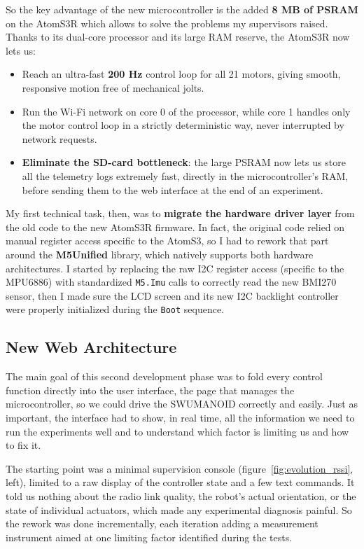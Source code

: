 \documentclass{tropLaClasse}
\begin{document}
So the key advantage of the new microcontroller is the added \textbf{8 MB of PSRAM} on the AtomS3R \cite{m5stack_atoms3r} which allows to solve the problems my supervisors raised. Thanks to its dual-core processor and its large RAM reserve, the AtomS3R now lets us:
\begin{itemize}
    \item Reach an ultra-fast \textbf{200 Hz} control loop for all 21 motors, giving smooth, responsive motion free of mechanical jolts.
    \item Run the Wi-Fi network on core 0 of the processor, while core 1 handles only the motor control loop in a strictly deterministic way, never interrupted by network requests.
    \item \textbf{Eliminate the SD-card bottleneck}: the large PSRAM now lets us store all the telemetry logs extremely fast, directly in the microcontroller's RAM, before sending them to the web interface at the end of an experiment.
\end{itemize}

My first technical task, then, was to \textbf{migrate the hardware driver layer} from the old code to the new AtomS3R firmware. In fact, the original code relied on manual register access specific to the AtomS3, so I had to rework that part around the \textbf{M5Unified} library, which natively supports both hardware architectures. I started by replacing the raw I2C register access (specific to the MPU6886) with standardized \texttt{M5.Imu} calls to correctly read the new BMI270 sensor, then I made sure the LCD screen and its new I2C backlight controller were properly initialized during the \texttt{Boot} sequence.


\subsection{New Web Architecture}
The main goal of this second development phase was to fold every control function directly into the user interface, the page that manages the microcontroller, so we could drive the SWUMANOID correctly and easily. Just as important, the interface had to show, in real time, all the information we need to run the experiments well and to understand which factor is limiting us and how to fix it.

The starting point was a minimal supervision console (figure~\ref{fig:evolution_rssi}, left), limited to a raw display of the controller state and a few text commands. It told us nothing about the radio link quality, the robot's actual orientation, or the state of individual actuators, which made any experimental diagnosis painful. So the rework was done incrementally, each iteration adding a measurement instrument aimed at one limiting factor identified during the tests. 
\end{document}
